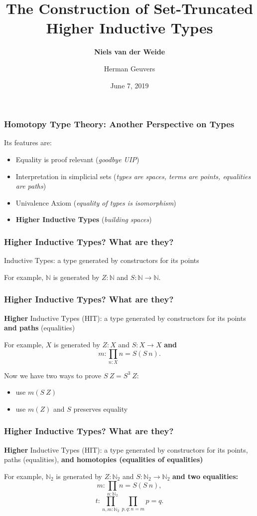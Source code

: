 \documentclass{beamer}
\title{The Construction of Set-Truncated Higher Inductive Types}
\author{\textbf{Niels van der Weide} \and Herman Geuvers}
\institute{Radboud University}
\date[MFPS2019]{June 7, 2019}
\begin{document}
\beamertemplatenavigationsymbolsempty

\frame
{
	\maketitle
}

\begin{frame}
\frametitle{Homotopy Type Theory: Another Perspective on Types}
Its features are:
\begin{itemize}
	\item Equality is proof relevant (\emph{goodbye UIP})
	\item<2,3,4> Interpretation in simplicial sets (\emph{types are spaces, terms are points, equalities are paths})
	\item<3,4> Univalence Axiom (\emph{equality of types is isomorphism})
	\item<4> \textbf{Higher Inductive Types} (\emph{building spaces})
\end{itemize}
\end{frame}

\begin{frame}
\frametitle{Higher Inductive Types? What are they?}
Inductive Types: a type generated by constructors for its points

For example, $\mathbb{N}$ is generated by $Z : \mathbb{N}$ and $S : \mathbb{N} \rightarrow \mathbb{N}$.
\end{frame}

\begin{frame}
\frametitle{Higher Inductive Types? What are they?}
\textbf{Higher} Inductive Types (HIT): a type generated by constructors for its points \textbf{and paths} (equalities)

For example, $X$ is generated by $Z : X$ and $S : X \rightarrow X$ \textbf{and}
\[
m : \prod_{n : X} n = S(S \> n).
\]

\pause

Now we have two ways to prove $S \> Z = S^3 \> Z$:
\begin{itemize}
	\item use $m(S \> Z)$
	\item use $m(Z)$ and $S$ preserves equality
\end{itemize}
\end{frame}

\begin{frame}
\frametitle{Higher Inductive Types? What are they?}
\textbf{Higher} Inductive Types (HIT): a type generated by constructors for its points, paths (equalities), \textbf{and homotopies (equalities of equalities)}

For example, $\mathbb{N}_2$ is generated by $Z : \mathbb{N}_2$ and $S : \mathbb{N}_2 \rightarrow \mathbb{N}_2$ \textbf{and two equalities:}
\[
m : \prod_{n : \mathbb{N}_2} n = S(S \> n),
\]
\[
t : \prod_{n, m : \mathbb{N}_2} \prod_{p, q : n = m} p = q.
\]
\end{frame}
\end{document}
